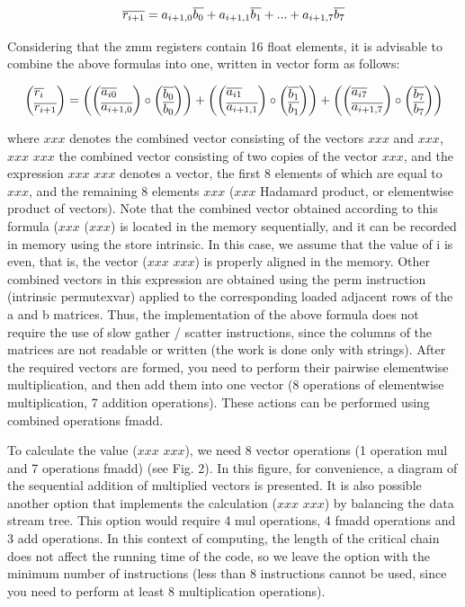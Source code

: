 \documentclass[
11pt,%
tightenlines,%
twoside,%
onecolumn,%
nofloats,%
nobibnotes,%
nofootinbib,%
superscriptaddress,%
noshowpacs,%
centertags]%
{revtex4}
\begin{document}
\begin{equation}
\overline{r_{i+1}} = a_{i+1,0}\overline{b_0} + a_{i+1,1}\overline{b_1} + ... + a_{i+1,7}\overline{b_7} \\
\end{equation}

Considering that the zmm registers contain 16 float elements, it is advisable to combine the above formulas into one, written in vector form as follows:

\begin{equation}
\left(\vcenter{\hbox{$\overline{r_i}$}\hbox{$\overline{r_{i+1}}$}}\right) =
\left(
\left(\vcenter{\hbox{$\overline{a_{i0}}$}\hbox{$\overline{a_{i+1,0}}$}}\right) \circ
\left(\vcenter{\hbox{$\overline{b_0}$}\hbox{$\overline{b_0}$}}\right)
\right) +
\left(
\left(\vcenter{\hbox{$\overline{a_{i1}}$}\hbox{$\overline{a_{i+1,1}}$}}\right) \circ
\left(\vcenter{\hbox{$\overline{b_1}$}\hbox{$\overline{b_1}$}}\right)
\right) +
\left(
\left(\vcenter{\hbox{$\overline{a_{i7}}$}\hbox{$\overline{a_{i+1,7}}$}}\right) \circ
\left(\vcenter{\hbox{$\overline{b_7}$}\hbox{$\overline{b_7}$}}\right)
\right)
\end{equation}

where $xxx$ denotes the combined vector consisting of the vectors $xxx$ and $xxx$, $xxx$ $xxx$ the combined vector consisting of two copies of the vector $xxx$, and the expression $xxx$ $xxx$ denotes a vector, the first 8 elements of which are equal to $xxx$, and the remaining 8 elements $xxx$ ($xxx$ Hadamard product, or elementwise product of vectors). Note that the combined vector obtained according to this formula ($xxx$ ($xxx$) is located in the memory sequentially, and it can be recorded in memory using the store intrinsic. In this case, we assume that the value of i is even, that is, the vector ($xxx$ $xxx$) is properly aligned in the memory. Other combined vectors in this expression are obtained using the perm instruction (intrinsic permutexvar) applied to the corresponding loaded adjacent rows of the a and b matrices. Thus, the implementation of the above formula does not require the use of slow gather / scatter instructions, since the columns of the matrices are not readable or written (the work is done only with strings). After the required vectors are formed, you need to perform their pairwise elementwise multiplication, and then add them into one vector (8 operations of elementwise multiplication, 7 addition operations). These actions can be performed using combined operations fmadd.

To calculate the value ($xxx$ $xxx$), we need 8 vector operations (1 operation mul and 7 operations fmadd) (see Fig. 2). In this figure, for convenience, a diagram of the sequential addition of multiplied vectors is presented. It is also possible another option that implements the calculation ($xxx$ $xxx$) by balancing the data stream tree. This option would require 4 mul operations, 4 fmadd operations and 3 add operations. In this context of computing, the length of the critical chain does not affect the running time of the code, so we leave the option with the minimum number of instructions (less than 8 instructions cannot be used, since you need to perform at least 8 multiplication operations).
\end{document}
